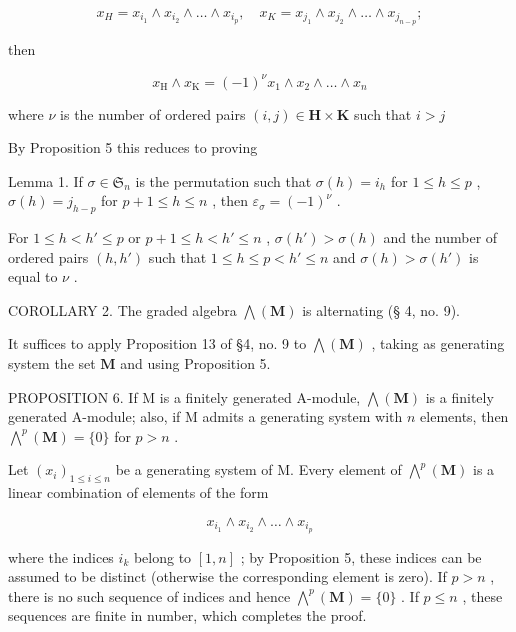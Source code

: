\[
x _ {H} = x _ {i _ {1}} \wedge x _ {i _ {2}} \wedge \dots \wedge x _ {i _ {p}}, \quad x _ {K} = x _ {j _ {1}} \wedge x _ {j _ {2}} \wedge \dots \wedge x _ {j _ {n - p}};
\]

then

\[
x _ {\mathrm{H}} \wedge x _ {\mathrm{K}} = (- 1) ^ {\nu} x _ {1} \wedge x _ {2} \wedge \dots \wedge x _ {n}\tag{7}
\]

where \(\nu\) is the number of ordered pairs \((i,j)\in \mathbf{H}\times \mathbf{K}\) such that \(i > j\)

By Proposition 5 this reduces to proving

Lemma 1. If \(\sigma \in \mathfrak{S}_n\) is the permutation such that \(\sigma(h) = i_h\) for \(1 \leqslant h \leqslant p\) , \(\sigma(h) = j_{h-p}\) for \(p + 1 \leqslant h \leqslant n\) , then \(\varepsilon_\sigma = (-1)^{\nu}\) .

For \(1 \leqslant h < h' \leqslant p\) or \(p + 1 \leqslant h < h' \leqslant n\) , \(\sigma(h') > \sigma(h)\) and the number of ordered pairs \((h, h')\) such that \(1 \leqslant h \leqslant p < h' \leqslant n\) and \(\sigma(h) > \sigma(h')\) is equal to \(\nu\) .

COROLLARY 2. The graded algebra \(\bigwedge (\mathbf{M})\) is alternating (§ 4, no. 9).

It suffices to apply Proposition 13 of §4, no. 9 to \(\bigwedge (\mathbf{M})\) , taking as generating system the set \(\mathbf{M}\) and using Proposition 5.

PROPOSITION 6. If M is a finitely generated A-module, \(\bigwedge (\mathbf{M})\) is a finitely generated A-module; also, if M admits a generating system with \(n\) elements, then \(\bigwedge^{p}(\mathbf{M}) = \{0\}\) for \(p > n\) .

Let \((x_{i})_{1\leqslant i\leqslant n}\) be a generating system of M. Every element of \(\bigwedge^{p}(\mathbf{M})\) is a linear combination of elements of the form

\[
x _ {i _ {1}} \wedge x _ {i _ {2}} \wedge \dots \wedge x _ {i _ {p}}
\]

where the indices \(i_k\) belong to \([1, n]\) ; by Proposition 5, these indices can be assumed to be distinct (otherwise the corresponding element is zero). If \(p > n\) , there is no such sequence of indices and hence \(\bigwedge^p(\mathbf{M}) = \{0\}\) . If \(p \leqslant n\) , these sequences are finite in number, which completes the proof.

